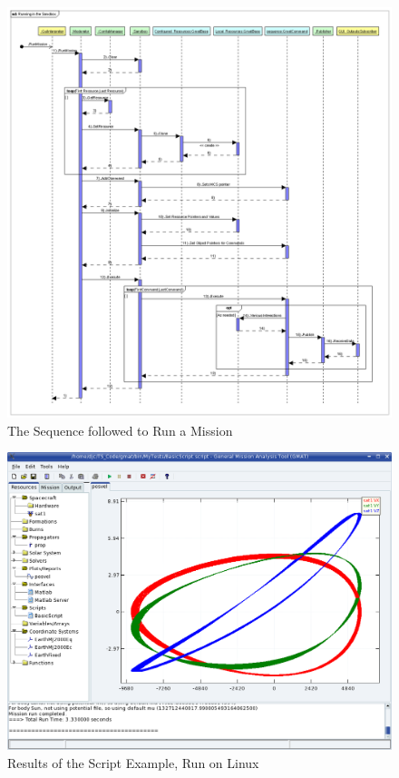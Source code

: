 \begin{figure}[H]
\begin{center}
\includegraphics[455,485]{Images/RunningintheSandbox.png}
\caption{\label{figure:RunningBasicScript}The Sequence followed to Run a Mission}
\end{center}
\end{figure}

\begin{figure}[H]
\begin{center}
\includegraphics[455,352]{Images/BasicMissionRunLinux.png}%
\caption{\label{figure:BasicScriptOutput}Results of the Script Example, Run on Linux}%
\end{center}
\end{figure}

